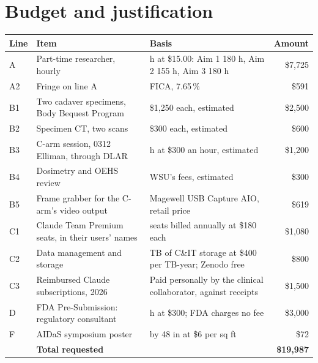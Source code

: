 \documentclass[10pt,letterpaper]{article}
\newcommand{\pct}{\,\%}
\begin{document}
\section*{Budget and justification}
{\small
\begin{tabularx}{\linewidth}{@{}l>{\raggedright\arraybackslash}p{2.35in}>{\raggedright\arraybackslash}X r@{}}
\toprule
Line & Item & Basis & Amount\\
\midrule
A & Part-time researcher, hourly & 515 h at \$15.00: Aim 1 180 h, Aim 2 155 h, Aim 3 180 h & \$7,725\\
A2 & Fringe on line A & FICA, 7.65\pct{} & \$591\\
B1 & Two cadaver specimens, Body Bequest Program & \$1,250 each, estimated & \$2,500\\
B2 & Specimen CT, two scans & \$300 each, estimated & \$600\\
B3 & C-arm session, 0312 Elliman, through DLAR & 4 h at \$300 an hour, estimated & \$1,200\\
B4 & Dosimetry and OEHS review & WSU's fees, estimated & \$300\\
B5 & Frame grabber for the C-arm's video output & Magewell USB Capture AIO, retail price & \$619\\
C1 & Claude Team Premium seats, in their users' names & 6 seats billed annually at \$180 each & \$1,080\\
C2 & Data management and storage & 2 TB of C\&IT storage at \$400 per TB-year; Zenodo free & \$800\\
C3 & Reimbursed Claude subscriptions, 2026 & Paid personally by the clinical collaborator, against receipts & \$1,500\\
D & FDA Pre-Submission: regulatory consultant & 10 h at \$300; FDA charges no fee & \$3,000\\
F & AIDaS symposium poster & 36 by 48 in at \$6 per sq ft & \$72\\
\midrule
& \textbf{Total requested} & & \textbf{\$19,987}\\
\bottomrule
\end{tabularx}}
\end{document}
